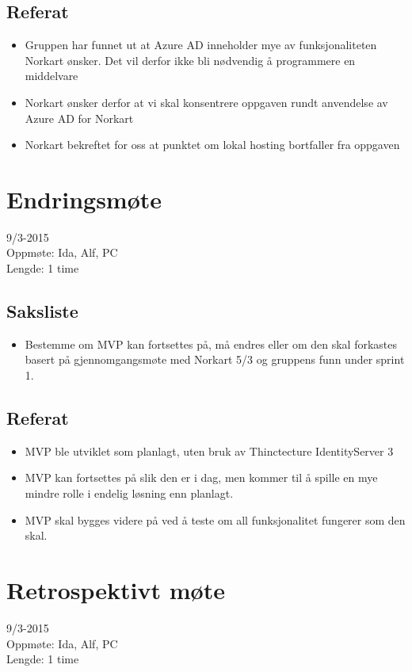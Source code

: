 \subsection{Referat}
\begin{itemize}
\item Gruppen har funnet ut at Azure AD inneholder mye av funksjonaliteten Norkart ønsker. Det vil derfor ikke bli nødvendig å programmere en middelvare 
\item Norkart ønsker derfor at vi skal konsentrere oppgaven rundt anvendelse av Azure AD for Norkart
\item Norkart bekreftet for oss at punktet om lokal hosting bortfaller fra oppgaven 
\end{itemize}


\section{Endringsmøte }
\label{app:MotereferaterSprint1_endringsmote}
9/3-2015 
\\Oppmøte: Ida, Alf, PC
\\Lengde: 1 time 
 
\subsection{Saksliste}
\begin{itemize}
\item Bestemme om MVP kan fortsettes på, må endres eller om den skal forkastes basert på gjennomgangsmøte med Norkart 5/3 og gruppens funn under sprint 1.
\end{itemize}

 
\subsection{Referat}
\begin{itemize}
\item MVP ble utviklet som planlagt, uten bruk av Thinctecture IdentityServer 3 
\item MVP kan fortsettes på slik den er i dag, men kommer til å spille en mye mindre rolle i endelig løsning enn planlagt. 
\item MVP skal bygges videre på ved å teste om all funksjonalitet fungerer som den skal. 
\end{itemize}


\section{Retrospektivt møte}
\label{app:MotereferaterSprint1_retrospektivmote}
9/3-2015 
\\Oppmøte: Ida, Alf, PC
\\Lengde: 1 time 
 
